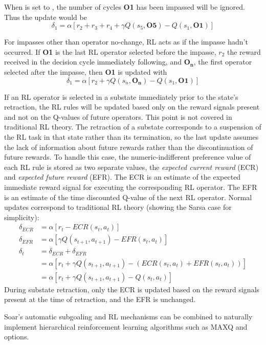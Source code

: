When  is set to , the number of cycles \textbf{O1} has been impassed will be ignored.
Thus the update would be
$$\delta_1 = \alpha \left[ r_2 + r_3 + r_4 + \gamma Q(s_5, \textbf{O5}) - Q(s_1, \textbf{O1}) \right]$$

For impasses other than operator no-change, RL acts as if the impasse hadn't occurred.
If \textbf{O1} is the last RL operator selected before the impasse, $r_2$ the reward received in the decision cycle immediately following, and \textbf{O}$_\textbf{n}$, the first operator selected after the impasse, then \textbf{O1} is updated with
$$\delta_1 = \alpha \left[ r_2 + \gamma Q(s_n, \textbf{O}_\textbf{n}) - Q(s_1, \textbf{O1}) \right]$$

If an RL operator is selected in a substate immediately prior to the state's retraction, the RL rules will be updated based only on the reward signals present and not on the Q-values of future operators.
This point is not covered in traditional RL theory.
The retraction of a substate corresponds to a suspension of the RL task in that state rather than its termination, so the last update assumes the lack of information about future rewards rather than the discontinuation of future rewards.
To handle this case, the numeric-indifferent preference value of each RL rule is stored as two separate values, the \textit{expected current reward} (ECR) and \textit{expected future reward} (EFR).
The ECR is an estimate of the expected immediate reward signal for executing the corresponding RL operator.
The EFR is an estimate of the time discounted Q-value of the next RL operator.
Normal updates correspond to traditional RL theory (showing the Sarsa case for simplicity):
\begin{align*}
\delta_{ECR} &= \alpha \left[ r_t - ECR(s_t, a_t) \right] \\
\delta_{EFR} &= \alpha \left[ \gamma Q(s_{t+1}, a_{t+1}) - EFR(s_t, a_t) \right] \\
\delta_t &= \delta_{ECR} + \delta_{EFR} \\
&= \alpha \left[ r_t + \gamma Q(s_{t+1}, a_{t+1}) - \left( ECR(s_t, a_t) + EFR(s_t, a_t) \right) \right] \\
&= \alpha \left[ r_t + \gamma Q(s_{t+1}, a_{t+1}) - Q(s_t, a_t) \right]
\end{align*}
During substate retraction, only the ECR is updated based on the reward signals present at the time of retraction, and the EFR is unchanged.

Soar's automatic subgoaling and RL mechanisms can be combined to naturally implement hierarchical reinforcement learning algorithms such as MAXQ and options.


